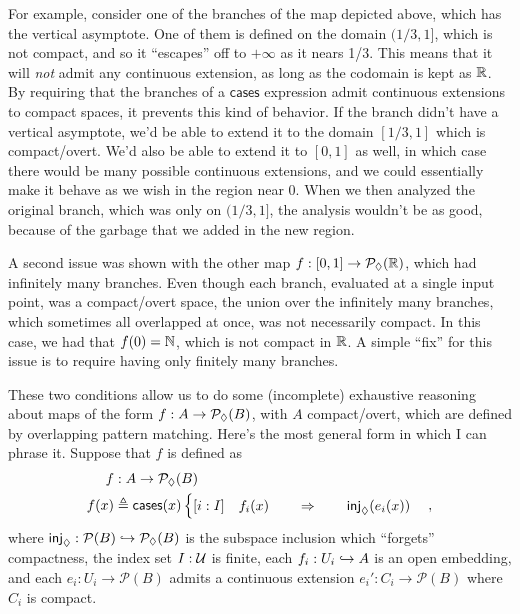 For example, consider one of the branches of the map depicted above, which has the vertical asymptote. One of them is defined on the domain $(1/3, 1]$, which is not compact, and so it ``escapes'' off to $+\infty$ as it nears 1/3. This means that it will \emph{not} admit any continuous extension, as long as the codomain is kept as $\mathbb{R}$. By requiring that the branches of a $\mathsf{cases}$ expression admit continuous extensions to compact spaces, it prevents this kind of behavior. If the branch didn't have a vertical asymptote, we'd be able to extend it to the domain $[1/3, 1]$ which is compact/overt. We'd also be able to extend it to $[0,1]$ as well, in which case there would be many possible continuous extensions, and we could essentially make it behave as we wish in the region near 0. When we then analyzed the original branch, which was only on $(1/3, 1]$, the analysis wouldn't be as good, because of the garbage that we added in the new region.

A second issue was shown with the other map $f : [0,1] \to \mathcal{P}_\lozenge(\mathbb{R})$, which had infinitely many branches. Even though each branch, evaluated at a single input point, was a compact/overt space, the union over the infinitely many branches, which sometimes all overlapped at once, was not necessarily compact. In this case, we had that $f(0) = \mathbb{N}$, which is not compact in $\mathbb{R}$. A simple ``fix'' for this issue is to require having only finitely many branches.

These two conditions allow us to do some (incomplete) exhaustive reasoning about maps of the form $f : A \to \mathcal{P}_\lozenge(B)$, with $A$ compact/overt, which are defined by overlapping pattern matching. Here's the most general form in which I can phrase it. Suppose that $f$ is defined as
\begin{align*}
f &: A \to \mathcal{P}_\lozenge(B)
\\
f(x) &\triangleq \mathsf{cases}(x)
\begin{cases}
[i : I] \quad f_i(x) \qquad \Rightarrow \qquad \mathsf{inj}_{\lozenge}(e_i(x))
\end{cases},
\end{align*}
where $\mathsf{inj}_\lozenge : \mathcal{P}(B) \hookrightarrow \mathcal{P}_\lozenge(B)$ is the subspace inclusion which ``forgets'' compactness, the index set $I : \mathcal{U}$ is finite, each $f_i : U_i \hookrightarrow A$ is an open embedding, and each $e_i : U_i \to \mathcal{P}(B)$ admits a continuous extension $e_i' : C_i \to \mathcal{P}(B)$ where $C_i$ is compact.

